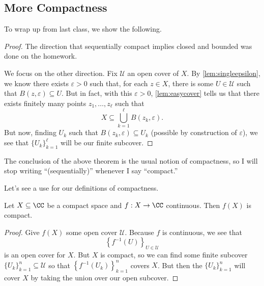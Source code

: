 
\subsection{More Compactness}
To wrap up from last class, we show the following.
\heineborel*
\begin{proof}
	The direction that sequentially compact implies closed and bounded was done on the homework.
	
	We focus on the other direction. Fix $\mathcal U$ an open cover of $X$. By \autoref{lem:singleepsilon}, we know there exists $\varepsilon>0$ such that, for each $z\in X$, there is some $U\in\mathcal U$ such that $B(z,\varepsilon)\subseteq U$. But in fact, with this $\varepsilon>0$, \autoref{lem:easycover} tells us that there exists finitely many points $z_1,\ldots,z_\ell$ such that
	\[X\subseteq\bigcup_{k=1}^\ell B(z_k,\varepsilon).\]
	But now, finding $U_k$ such that $B(z_k,\varepsilon)\subseteq U_k$ (possible by construction of $\varepsilon$), we see that $\{U_k\}_{k=1}^\ell$ will be our finite subcover.
\end{proof}
\begin{remark}
	The conclusion of the above theorem is the usual notion of compactness, so I will stop writing ``(sequentially)'' whenever I say ``compact.''
\end{remark}
Let's see a use for our definitions of compactness.
\begin{corollary}
	Let $X\subseteq\CC$ be a compact space and $f:X\to\CC$ continuous. Then $f(X)$ is compact.
\end{corollary}
\begin{proof}
	Give $f(X)$ some open cover $\mathcal U$. Because $f$ is continuous, we see that
	\[\left\{f^{-1}(U)\right\}_{U\in\mathcal U}\]
	is an open cover for $X$. But $X$ is compact, so we can find some finite subcover $\{U_k\}_{k=1}^n\subseteq\mathcal U$ so that $\left\{f^{-1}(U_k)\right\}_{k=1}^n$ covers $X$. But then the $\{U_k\}_{k=1}^n$ will cover $X$ by taking the union over our open subcover.
\end{proof}

